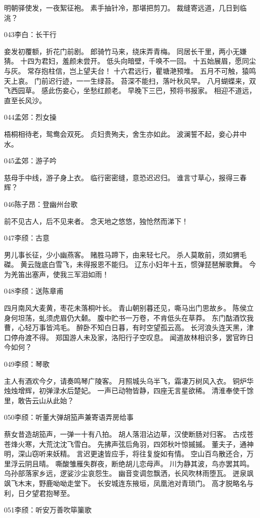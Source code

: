 明朝驿使发，一夜絮征袍。
素手抽针冷，那堪把剪刀。
裁缝寄远道，几日到临洮？

043李白：长干行

妾发初覆额，折花门前剧。
郎骑竹马来，绕床弄青梅。
同居长干里，两小无嫌猜。
十四为君妇，羞颜未尝开。
低头向暗壁，千唤不一回。
十五始展眉，愿同尘与灰。
常存抱柱信，岂上望夫台！
十六君远行，瞿塘滟预堆。
五月不可触，猿鸣天上哀。
门前迟行迹，一一生绿苔。
苔深不能扫，落叶秋风早。
八月蝴蝶来，双飞西园草。
感此伤妾心，坐愁红颜老。
早晚下三巴，预将书报家。
相迎不道远，直至长风沙。

044孟郊：烈女操

梧桐相待老，鸳鸯会双死。
贞妇贵殉夫，舍生亦如此。
波澜誓不起，妾心井中水。

045孟郊：游子吟

慈母手中线，游子身上衣。
临行密密缝，意恐迟迟归。
谁言寸草心，报得三春辉？

046陈子昂：登幽州台歌

前不见古人，后不见来者。
念天地之悠悠，独怆然而涕下！

047李颀：古意

男儿事长征，少小幽燕客。
赌胜马蹄下，由来轻七尺。
杀人莫敢前，须如猬毛磔。
黄云陇底白雪飞，未得报恩不能归。
辽东小妇年十五，惯弹琵琶解歌舞。
今为羌笛出塞声，使我三军泪如雨！

048李颀：送陈章甫

四月南风大麦黄，枣花未落桐叶长。
青山朝别暮还见，嘶马出门思故乡。
陈侯立身何坦荡，虬须虎眉仍大颡。
腹中贮书一万卷，不肯低头在草莽。
东门酤酒饮我曹，心轻万事皆鸿毛。
醉卧不知白日暮，有时空望孤云高。
长河浪头连天黑，津口停舟渡不得。
郑国游人未及家，洛阳行子空叹息。
闻道故林相识多，罢官昨日今如何？

049李颀：琴歌

主人有酒欢今夕，请奏鸣琴广陵客。
月照城头乌半飞，霜凄万树风入衣。
铜炉华烛烛增辉，初弹渌水后楚妃。
一声已动物皆静，四座无言星欲稀。
清淮奉使千馀里，敢告云山从此始？

050李颀：听董大弹胡笳声兼寄语弄房给事

蔡女昔造胡笳声，一弹一十有八拍。
胡人落泪沾边草，汉使断肠对归客。
古戍苍苍烽火寒，大荒沈沈飞雪白。
先拂声弦后角羽，四郊秋叶惊摵摵。
董夫子，通神明，深山窃听来妖精。
言迟更速皆应手，将往复旋如有情。
空山百鸟散还合，万里浮云阴且晴。
嘶酸雏雁失群夜，断绝胡儿恋母声。
川为静其波，鸟亦罢其鸣。
乌孙部落家乡远，逻娑沙尘哀怨生。
幽音变调忽飘洒，长风吹林雨堕瓦。
迸泉飒飒飞木末，野鹿呦呦走堂下。
长安城连东掖垣，凤凰池对青琐门。
高才脱略名与利，日夕望君抱琴至。

051李颀：听安万善吹筚篥歌

